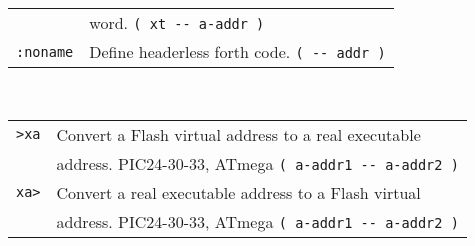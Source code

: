 \documentclass[10pt,landscape,a4paper]{article}
\begin{document}
\begin{multicols}{3}
\begin{tabular}{@{}ll@{}}
             & word. \verb!( xt -- a-addr )! \\
\verb!:noname! & Define headerless forth code. \verb!( -- addr )! \\
\end{tabular} \\
\begin{tabular}{@{}ll@{}}
\verb!>xa!  & Convert a Flash virtual address to a real executable \\
            & address. PIC24-30-33, ATmega \verb!( a-addr1 -- a-addr2 )! \\
\verb!xa>!  & Convert a real executable address to a Flash virtual \\
            & address. PIC24-30-33, ATmega \verb!( a-addr1 -- a-addr2 )! \\
\end{tabular} \\

\medskip


\end{multicols}
\end{document}
